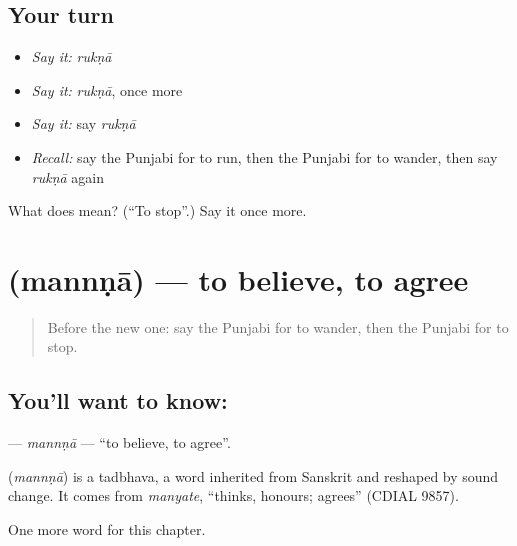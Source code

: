 \subsection*{Your turn}
\begin{itemize}
\raggedright
  \item \emph{Say it:} \emph{rukṇā}
  \item \emph{Say it:} \emph{rukṇā}, once more
  \item \emph{Say it:} say \emph{rukṇā}
  \item \emph{Recall:} say the Punjabi for to run, then the Punjabi for to wander, then say \emph{rukṇā} again
\end{itemize}

\begin{tcolorbox}[breakable,colback=teal!4,colframe=teal!35!black,title={Before you move on}]
What does  mean? (\textquotedblleft{}To stop\textquotedblright{}.) Say it once more.
\end{tcolorbox}
\section[\texorpdfstring{\pa{ਮੰਨਣਾ} (mannṇā)}{ਮੰਨਣਾ (mannṇā)}]{ (mannṇā) — to believe, to agree}

\label{lesson:PA-C152-mannna}



\begin{quote}
Before the new one: say the Punjabi for to wander, then the Punjabi for to stop.
\end{quote}

\subsection*{You'll want to know: }
\textbf{} — \emph{mannṇā} — \textquotedblleft{}to believe, to agree\textquotedblright{}.

\begin{cousinweb}
\textbf{} (\emph{mannṇā}) is a tadbhava, a word inherited from Sanskrit and reshaped by sound change. It comes from \emph{manyate}, \textquotedblleft{}thinks, honours; agrees\textquotedblright{} (CDIAL 9857).
\end{cousinweb}

\begin{grammarlens}[title={What you've built}]
One more word for this chapter.
\end{grammarlens}

